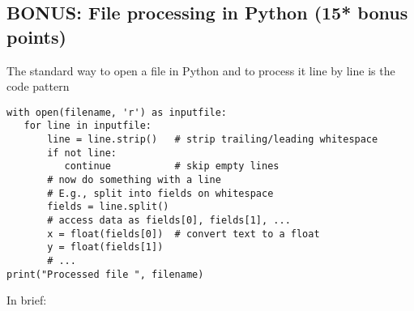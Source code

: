 \documentclass[letterpaper]{scrartcl}
\begin{document}
\subsection{BONUS: File processing in Python (15* bonus points)}
The standard way to open a file in Python and to process it line by
line is the code pattern
\begin{verbatim}
with open(filename, 'r') as inputfile:
   for line in inputfile:
       line = line.strip()   # strip trailing/leading whitespace
       if not line:
          continue           # skip empty lines
       # now do something with a line
       # E.g., split into fields on whitespace
       fields = line.split()
       # access data as fields[0], fields[1], ... 
       x = float(fields[0])  # convert text to a float 
       y = float(fields[1])
       # ...
print("Processed file ", filename)
\end{verbatim}
In brief: 
\end{document}
